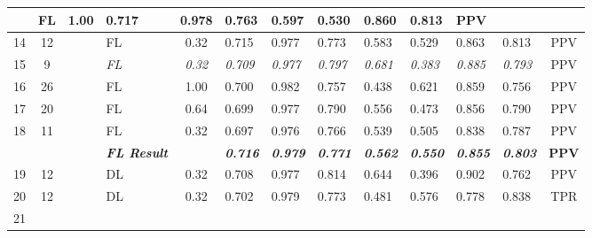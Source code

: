 \begin{table}[H]
{\begin{tabular}{lcc|l|c|l|l|l|l|l|l|l|c|}
    \cellcolor[HTML]{6638B6}{\color[HTML]{FFFFFF} DB} &
    FL &
    1.00 &
    0.717 &
    0.978 &
    0.763 &
    0.597 &
    0.530 &
    0.860 &
    0.813 &
    PPV \\ \hline
  \multicolumn{1}{|l|}{14} &
    \multicolumn{1}{c|}{12} &
    \cellcolor[HTML]{6638B6}{\color[HTML]{FFFFFF} DB} &
    FL &
    0.32 &
    0.715 &
    0.977 &
    0.773 &
    0.583 &
    0.529 &
    0.863 &
    0.813 &
    PPV \\ \hline
  \multicolumn{1}{|l|}{15} &
    \multicolumn{1}{c|}{9} &
    \cellcolor[HTML]{6638B6}{\color[HTML]{FFFFFF} DB} &
    \textit{FL} &
    \textit{0.32} &
    \textit{0.709} &
    \textit{0.977} &
    \textit{0.797} &
    \textit{0.681} &
    \textit{0.383} &
    \textit{0.885} &
    \textit{0.793} &
    PPV \\ \hline
  \multicolumn{1}{|l|}{16} &
    \multicolumn{1}{c|}{26} &
    \cellcolor[HTML]{6638B6}{\color[HTML]{FFFFFF} DB} &
    FL &
    1.00 &
    0.700 &
    0.982 &
    0.757 &
    0.438 &
    0.621 &
    0.859 &
    0.756 &
    PPV \\ \hline
  \multicolumn{1}{|l|}{17} &
    \multicolumn{1}{c|}{20} &
    \cellcolor[HTML]{6638B6}{\color[HTML]{FFFFFF} DB} &
    FL &
    0.64 &
    0.699 &
    0.977 &
    0.790 &
    0.556 &
    0.473 &
    0.856 &
    0.790 &
    PPV \\ \hline
  \multicolumn{1}{|l|}{18} &
    \multicolumn{1}{c|}{11} &
    \cellcolor[HTML]{6638B6}{\color[HTML]{FFFFFF} DB} &
    FL &
    0.32 &
    0.697 &
    0.976 &
    0.766 &
    0.539 &
    0.505 &
    0.838 &
    0.787 &
    PPV \\ \hline
   &
     &
     &
    \textit{\textbf{FL Result}} &
    \textit{\textbf{}} &
    \textit{\textbf{0.716}} &
    \textit{\textbf{0.979}} &
    \textit{\textbf{0.771}} &
    \textit{\textbf{0.562}} &
    \textit{\textbf{0.550}} &
    \textit{\textbf{0.855}} &
    \textit{\textbf{0.803}} &
    \textbf{PPV} \\ \hline
  \multicolumn{1}{|l|}{19} &
    \multicolumn{1}{c|}{12} &
    \cellcolor[HTML]{00A9CE}{\color[HTML]{FFFFFF} RB} &
    DL &
    0.32 &
    0.708 &
    0.977 &
    0.814 &
    0.644 &
    0.396 &
    0.902 &
    0.762 &
    PPV \\ \hline
  \multicolumn{1}{|l|}{20} &
    \multicolumn{1}{c|}{12} &
    \cellcolor[HTML]{00A9CE}{\color[HTML]{FFFFFF} RB} &
    DL &
    0.32 &
    0.702 &
    0.979 &
    0.773 &
    0.481 &
    0.576 &
    0.778 &
    0.838 &
    TPR \\ \hline
  \multicolumn{1}{|l|}{21} &

\end{tabular}}
\end{table}

